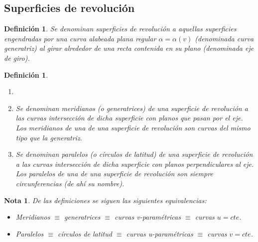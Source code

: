 \documentclass[twoside]{article}
\newtheorem{defi}[theorem]{Definición}
\newtheorem{nota}[theorem]{Nota}
\numberwithin{equation}{section}
\begin{document}
\subsection{Superficies de revolución}

\begin{defi} Se denominan {\em superficies de revoluci\'on} a aquellas superficies engendradas por una curva alabeada plana regular {\bf $\alpha = \alpha(v)$} (denominada curva generatriz) al girar alrededor de una recta contenida en su plano (denominada eje de giro).
\end{defi}

\begin{defi}
\begin{enumerate}\item[]
\item [a)] Se denominan {\em meridianos} (o generatrices) de una superficie de revoluci\'on a las curvas intersecci\'on de dicha superficie con planos
que pasan por el eje. Los meridianos de una de una superficie de revoluci\'on son curvas del mismo tipo que la generatriz.

\item [b)] Se denominan {\em paralelos} (o c\'irculos de latitud) de una superficie de revoluci\'on a las curvas intersecci\'on de dicha superficie con planos perpendiculares al eje. Los paralelos de una de una superficie de revoluci\'on son siempre circunferencias (de ahí su nombre).
\end{enumerate}
\end{defi}
\begin{nota} De las definiciones se siguen las siguientes equivalencias:
\begin{itemize}
\item Meridianos $\equiv$ generatrices $\equiv$ curvas v-param\'etricas $\equiv$ curvas {\bf $u = cte$}.
\item Paralelos $\equiv$ c\'irculos de latitud $\equiv$ curvas u-param\'etricas $\equiv$ curvas {\bf $v = cte$}.
\end{itemize} 
\end{nota}
\end{document}
